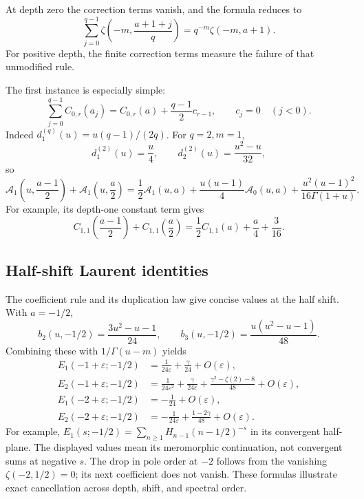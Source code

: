 \documentclass[11pt,letterpaper]{article}
\numberwithin{equation}{section}
\theoremstyle{plain}
\theoremstyle{definition}
\theoremstyle{remark}
\begin{document}
At depth zero the correction terms vanish, and the formula reduces to
\[
 \sum_{j=0}^{q-1}
       \zeta\left(-m,\frac{a+1+j}{q}\right)
       =q^{-m}\zeta(-m,a+1).
\]
For positive depth, the finite correction terms measure the failure of
that unmodified rule.

The first instance is especially simple:
\begin{equation}\label{harm:eq:multiplicationzero}
 \sum_{j=0}^{q-1}C_{0,r}(a_j)
       =C_{0,r}(a)+\frac{q-1}{2}c_{r-1},
 \qquad c_j=0\quad(j<0).
\end{equation}
Indeed \(d_1^{(q)}(u)=u(q-1)/(2q)\). For \(q=2,m=1\),
\[
 d_1^{(2)}(u)=\frac u4,\qquad
 d_2^{(2)}(u)=\frac{u^2-u}{32},
\]
so
\begin{equation}\label{harm:eq:duplicationgerm}
 \mathcal A_1\left(u,\frac{a-1}{2}\right)
 +\mathcal A_1\left(u,\frac a2\right)
 =\frac12\mathcal A_1(u,a)
   +\frac{u(u-1)}4\mathcal A_0(u,a)
   +\frac{u^2(u-1)^2}{16\Gamma(1+u)}.
\end{equation}
For example, its depth-one constant term gives
\[
 C_{1,1}\left(\frac{a-1}{2}\right)
 +C_{1,1}\left(\frac a2\right)
 =\frac12C_{1,1}(a)+\frac a4+\frac3{16}.
\]

\subsection{Half-shift Laurent identities}

The coefficient rule and its duplication law give concise values at the
half shift. With \(a=-1/2\),
\[
 b_2(u,-1/2)=\frac{3u^2-u-1}{24},\qquad
 b_3(u,-1/2)=\frac{u(u^2-u-1)}{48}.
\]
Combining these with \(1/\Gamma(u-m)\) yields
\begin{align}
 E_1(-1+\varepsilon;-1/2)
  &=\frac{1}{24\varepsilon}+\frac{\gamma}{24}
       +O(\varepsilon),\label{harm:eq:half11}\\
 E_2(-1+\varepsilon;-1/2)
  &=\frac{1}{24\varepsilon^2}
      +\frac{\gamma}{24\varepsilon}
      +\frac{\gamma^2-\zeta(2)-8}{48}
       +O(\varepsilon),\label{harm:eq:half21}\\
 E_1(-2+\varepsilon;-1/2)
  &=-\frac1{24}+O(\varepsilon),\label{harm:eq:half12}\\
 E_2(-2+\varepsilon;-1/2)
  &=-\frac{1}{24\varepsilon}+\frac{1-2\gamma}{48}
       +O(\varepsilon).\label{harm:eq:half22}
\end{align}
For example, \(E_1(s;-1/2)=\sum_{n\geq1}H_{n-1}(n-1/2)^{-s}\)
in its convergent half-plane. The displayed values mean its
meromorphic continuation, not convergent sums at negative \(s\).
The drop in pole order at \(-2\) follows from the vanishing
\(\zeta(-2,1/2)=0\); its next coefficient does not vanish.
These formulas illustrate exact cancellation across depth, shift, and
spectral order.
\end{document}
